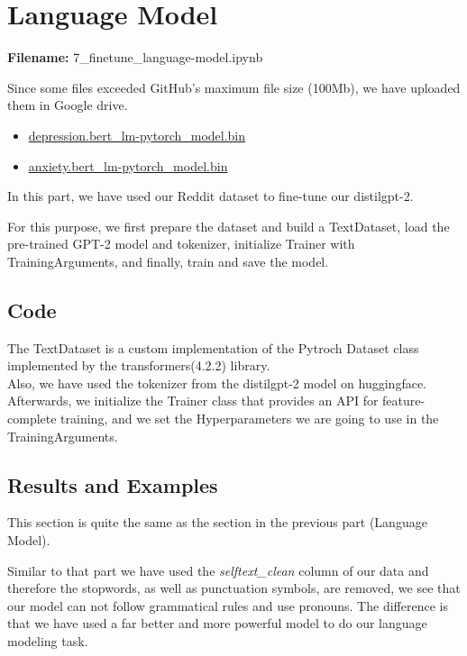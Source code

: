 \documentclass[12pt, a4paper]{article}
\begin{document}
	
	\section{Language Model}
	\large{\textbf{Filename:} 7\_finetune\_language-model.ipynb}
	
	Since some files exceeded GitHub's maximum file size (100Mb), we have uploaded them in Google drive. 
	\begin{itemize}
		\item \href{https://drive.google.com/file/d/1AmbAl9mFoGG9mITTTz7TRgPEwVUAiN9U/view?usp=sharing}{depression.bert\_lm-pytorch\_model.bin}
		\item
		\href{https://drive.google.com/file/d/19-KhVSsBFo7WpfzeXNKDpUnYKv5xfDkY/view?usp=sharing}{anxiety.bert\_lm-pytorch\_model.bin}
	\end{itemize}
	
	\vspace{5mm}
	In this part, we have used our Reddit dataset to fine-tune our distilgpt-2.
	
	For this purpose, we first prepare the dataset and build a TextDataset, load the pre-trained GPT-2 model and tokenizer, initialize Trainer with TrainingArguments, and finally, train and save the model. 
	
	\subsection{Code}
	The TextDataset is a custom implementation of the Pytroch Dataset class implemented by the transformers(4.2.2) library.
	\\Also, we have used the tokenizer from the distilgpt-2 model on huggingface.
	\\Afterwards, we initialize the Trainer class that provides an API for feature-complete training, and we set the Hyperparameters we are going to use in the TrainingArguments.
	
	\subsection{Results and Examples}
	This section is quite the same as the section in the previous part (Language Model). 
	
	Similar to that part we have used the \emph{selftext\_clean} column of our data and therefore the stopwords, as well as punctuation symbols, are removed, we see that our model can not follow grammatical rules and use pronouns. The difference is that we have used a far better and more powerful model to do our language modeling task.
	
\end{document}
